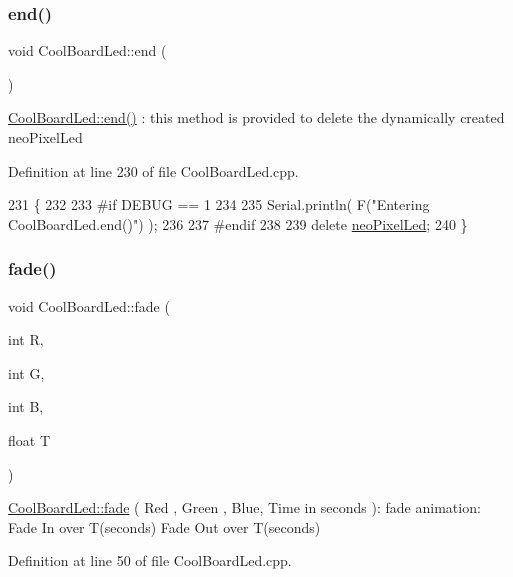 \subsubsection{\texorpdfstring{end()}{end()}}
{\footnotesize\ttfamily void Cool\+Board\+Led\+::end (\begin{DoxyParamCaption}{ }\end{DoxyParamCaption})}

\hyperlink{class_cool_board_led_a69f323359e0c9f797422f2152b5d41ef}{Cool\+Board\+Led\+::end()} \+: this method is provided to delete the dynamically created neo\+Pixel\+Led 

Definition at line 230 of file Cool\+Board\+Led.\+cpp.


\begin{DoxyCode}
231 \{
232 
233 \textcolor{preprocessor}{#if DEBUG == 1 }
234     
235     Serial.println( F(\textcolor{stringliteral}{"Entering CoolBoardLed.end()"}) );
236 
237 \textcolor{preprocessor}{#endif}
238 
239     \textcolor{keyword}{delete} \hyperlink{class_cool_board_led_ac2c13fa462a010cd9242bf297c013923}{neoPixelLed};
240 \}
\end{DoxyCode}
\mbox{\label{class_cool_board_led_af1cacbaa88db8bcf6042c1083ba41155}} 
\subsubsection{\texorpdfstring{fade()}{fade()}}
{\footnotesize\ttfamily void Cool\+Board\+Led\+::fade (\begin{DoxyParamCaption}\item[{int}]{R,  }\item[{int}]{G,  }\item[{int}]{B,  }\item[{float}]{T }\end{DoxyParamCaption})}

\hyperlink{class_cool_board_led_af1cacbaa88db8bcf6042c1083ba41155}{Cool\+Board\+Led\+::fade} ( Red , Green , Blue, Time in seconds )\+: fade animation\+: Fade In over T(seconds) Fade Out over T(seconds) 

Definition at line 50 of file Cool\+Board\+Led.\+cpp.



